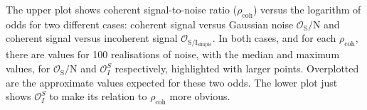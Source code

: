 \label{fig:approx_odds}
The upper plot shows coherent signal-to-noise ratio ($\rho_{\text{coh}}$) versus the logarithm of odds for
two different cases: coherent signal versus Gaussian noise $\mathcal{O}_{\text{S}}/{\text{N}}$ and coherent signal versus
incoherent signal $\mathcal{O}_{\text{S}/\text{I}_{\text{simple}}}$. In both cases, and for each $\rho_{\text{coh}}$, there are values for
100 realisations of noise, with the median and maximum values, for $\mathcal{O}_{\text{S}}/{\text{N}}$ and $\mathcal{O}^S_I$
respectively, highlighted with larger points. Overplotted are the approximate values expected for these two
odds. The lower plot just shows $\mathcal{O}^S_I$ to make its relation to $\rho_{\text{coh}}$ more obvious.
